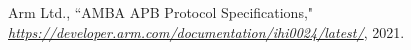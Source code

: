 \begin{thebibliography}{100} %

\setlength{\parskip}{0pt}
\setlength{\itemsep}{0pt plus 0.3ex}

 Arm Ltd., ``AMBA APB Protocol Specifications,"
   \emph{\href{https://developer.arm.com/documentation/ihi0024/latest}{https://developer.arm.com/documentation/ihi0024/latest/}}, 2021.

\end{thebibliography}